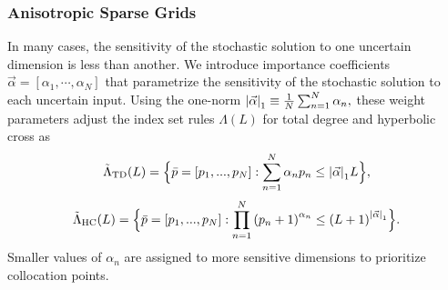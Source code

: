 \documentclass{anstrans}
\begin{document}

\subsubsection{Anisotropic Sparse Grids}
In many cases, the sensitivity of the stochastic solution to one uncertain dimension is less than another.  %
We introduce importance coefficients $\vec\alpha=[\alpha_1,\cdots,\alpha_N]$ that parametrize the sensitivity of the stochastic solution to each uncertain input.  Using the one-norm
$\qty|\vec\alpha|_1\equiv\frac{1}{N}\sum_{n=1}^N \alpha_n,$
these weight parameters adjust the index set rules $\Lambda(L)$ for total degree and hyperbolic cross as
\begin{equation}
\tilde\Lambda_\text{TD}(L)=\Big\{\bar p=[p_1,...,p_N]:\sum_{n=1}^N \alpha_n p_n \leq \qty|\vec\alpha|_1 L \Big\},
\end{equation}
\begin{equation}
\tilde\Lambda_\text{HC}(L)=\Big\{\bar p=[p_1,...,p_N]:\prod_{n=1}^N \qty(p_n+1)^{\alpha_n} \leq \qty(L+1)^{\qty|\vec\alpha|_1} \Big\}.
\end{equation}
Smaller values of $\alpha_n$ are assigned to more sensitive dimensions to prioritize collocation points.
\end{document}
